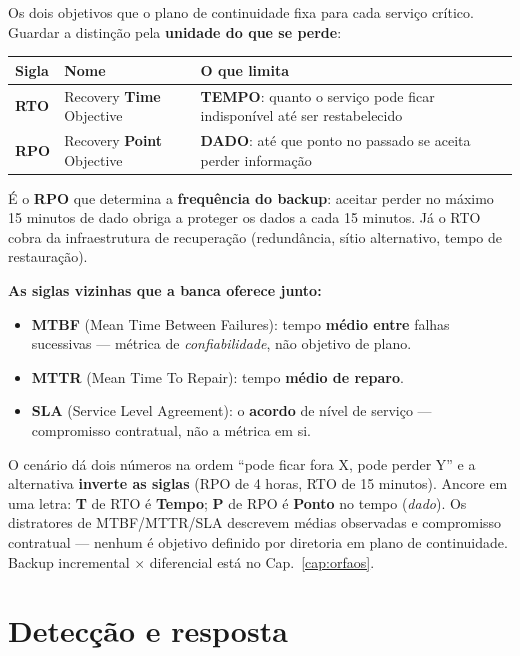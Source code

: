 Os dois objetivos que o plano de continuidade fixa para cada serviço crítico.
Guardar a distinção pela \textbf{unidade do que se perde}:

\begin{center}
\begin{tabular}{@{}p{1.6cm}p{4.4cm}p{6cm}@{}}
\toprule
\textbf{Sigla} & \textbf{Nome} & \textbf{O que limita} \\
\midrule
\textbf{RTO} & Recovery \textbf{Time} Objective & \textbf{TEMPO}: quanto o serviço pode ficar indisponível até ser restabelecido \\
\textbf{RPO} & Recovery \textbf{Point} Objective & \textbf{DADO}: até que ponto no passado se aceita perder informação \\
\bottomrule
\end{tabular}
\end{center}

É o \textbf{RPO} que determina a \textbf{frequência do backup}: aceitar perder
no máximo 15 minutos de dado obriga a proteger os dados a cada 15 minutos. Já
o RTO cobra da infraestrutura de recuperação (redundância, sítio alternativo,
tempo de restauração).

\textbf{As siglas vizinhas que a banca oferece junto:}
\begin{itemize}
\item \textbf{MTBF} (Mean Time Between Failures): tempo \textbf{médio entre}
falhas sucessivas --- métrica de \emph{confiabilidade}, não objetivo de plano.
\item \textbf{MTTR} (Mean Time To Repair): tempo \textbf{médio de reparo}.
\item \textbf{SLA} (Service Level Agreement): o \textbf{acordo} de nível de
serviço --- compromisso contratual, não a métrica em si.
\end{itemize}

\begin{pegadinha}
O cenário dá dois números na ordem ``pode ficar fora X, pode perder Y'' e a
alternativa \textbf{inverte as siglas} (RPO de 4 horas, RTO de 15 minutos).
Ancore em uma letra: \textbf{T} de RTO é \textbf{Tempo}; \textbf{P} de RPO é
\textbf{Ponto} no tempo (\emph{dado}). Os distratores de MTBF/MTTR/SLA
descrevem médias observadas e compromisso contratual --- nenhum é objetivo
definido por diretoria em plano de continuidade. Backup incremental $\times$
diferencial está no Cap.~\ref{cap:orfaos}.
\end{pegadinha}

\section{Detecção e resposta}

